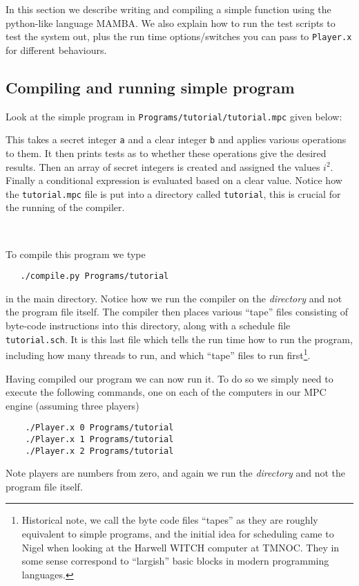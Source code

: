 \label{sec:example}
In this section we describe writing and compiling a simple
function using the python-like language MAMBA.
We also explain how to run the test scripts to test the system
out, plus the run time options/switches you can pass to 
\verb+Player.x+ for different behaviours.

\subsection{Compiling and running simple program}
Look at the simple program in \verb+Programs/tutorial/tutorial.mpc+
given below:


This takes a secret integer \verb+a+ and a clear integer \verb+b+
and applies various operations to them. It then prints tests
as to whether these operations give the desired results.
Then an array of secret integers is created and assigned the
values $i^2$. Finally a conditional expression is evaluated
based on a clear value.
Notice how the \verb+tutorial.mpc+ file is put into a directory
called \verb+tutorial+, this is crucial for the running of
the compiler.

~~

\noindent
To compile this program we type
\begin{verbatim}
   ./compile.py Programs/tutorial
\end{verbatim}
in the main directory. Notice how we run the compiler on the
{\em directory} and not the program file itself.
The compiler then places various ``tape'' files consisting of 
byte-code instructions into this directory, along with a
schedule file \verb+tutorial.sch+. It is this last file which
tells the run time how to run the program, including how
many threads to run, and which ``tape'' files to run 
first\footnote{Historical note, we call the byte code files ``tapes''
as they are roughly equivalent to simple programs, and
the initial idea for scheduling came to Nigel when looking at
the Harwell WITCH computer at TMNOC. They in some sense
correspond to ``largish'' basic blocks in modern programming
languages.}.

Having compiled our program we can now run it. To do so
we simply need to execute the following commands, one on
each of the computers in our MPC engine (assuming three players)
\begin{verbatim}
    ./Player.x 0 Programs/tutorial
    ./Player.x 1 Programs/tutorial
    ./Player.x 2 Programs/tutorial
\end{verbatim}
Note players are numbers from zero, and again we run the
{\em directory} and not the program file itself.

